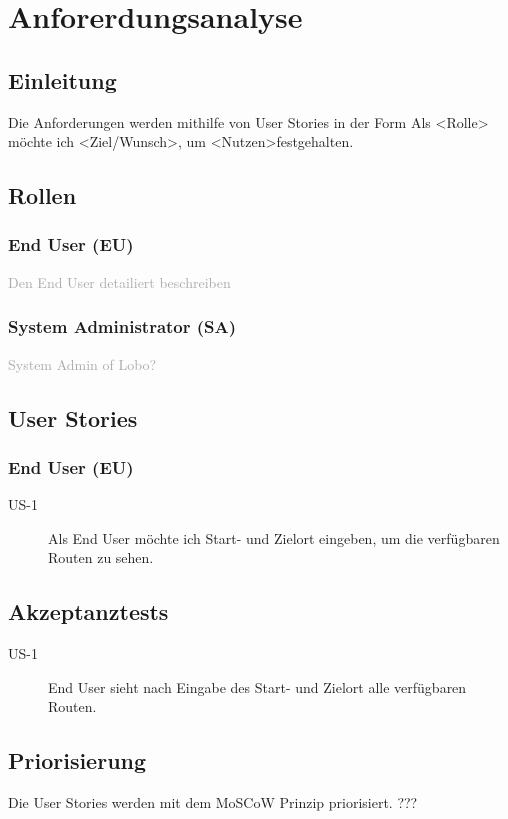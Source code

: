 \chapter{Anforerdungsanalyse}
\label{sec:anforderungsanalyse}


\section{Einleitung}
Die Anforderungen werden mithilfe von User Stories in der Form \glqq Als <Rolle> möchte ich <Ziel/Wunsch>, um <Nutzen>\grqq festgehalten.

\section{Rollen}
\subsection{End User (EU)}
\textcolor{darkgray}{
	Den End User detailiert beschreiben
}
\subsection{System Administrator (SA)}
\textcolor{darkgray}{
	System Admin of Lobo?
}

\section{User Stories}
\subsection{End User (EU)}

\begin{description}
\item[US-1] Als End User möchte ich Start- und Zielort eingeben, um die verfügbaren Routen zu sehen.
\end{description}

\section{Akzeptanztests}

\begin{description}
\item[US-1] End User sieht nach Eingabe des Start- und Zielort alle verfügbaren Routen.
\end{description}


\section{Priorisierung}
Die User Stories werden mit dem MoSCoW Prinzip priorisiert.
???



